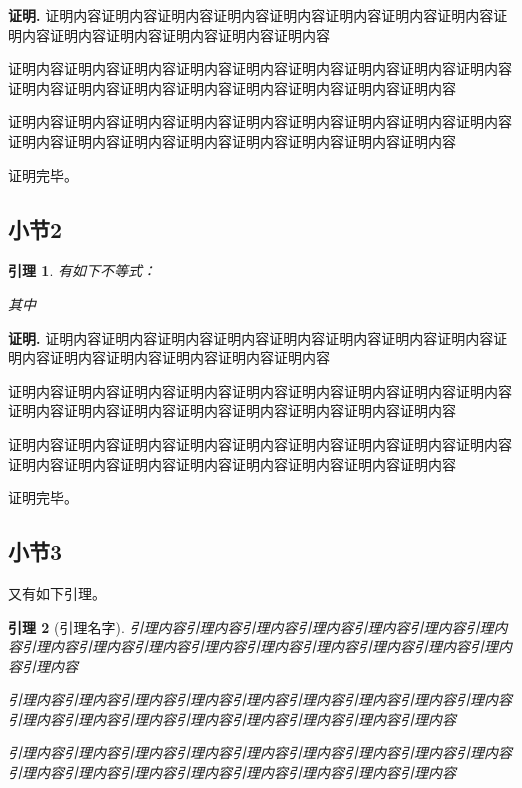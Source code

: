 \documentclass[a4paper, 12pt, oneside]{article}
\theoremstyle{cn_theorem}
\newtheorem{lemma}{引理}[section]   %
\begin{document}
\textbf{\heiti 证明.} 证明内容证明内容证明内容证明内容证明内容证明内容证明内容证明内容证明内容证明内容证明内容证明内容证明内容证明内容

证明内容证明内容证明内容证明内容证明内容证明内容证明内容证明内容证明内容证明内容证明内容证明内容证明内容证明内容证明内容证明内容证明内容

证明内容证明内容证明内容证明内容证明内容证明内容证明内容证明内容证明内容证明内容证明内容证明内容证明内容证明内容证明内容证明内容证明内容

证明完毕。

\subsection{小节2}

\begin{lemma} \label{公式交叉引用名字}
有如下不等式：

其中

\end{lemma}

\textbf{\heiti 证明.} 证明内容证明内容证明内容证明内容证明内容证明内容证明内容证明内容证明内容证明内容证明内容证明内容证明内容证明内容

证明内容证明内容证明内容证明内容证明内容证明内容证明内容证明内容证明内容证明内容证明内容证明内容证明内容证明内容证明内容证明内容证明内容

证明内容证明内容证明内容证明内容证明内容证明内容证明内容证明内容证明内容证明内容证明内容证明内容证明内容证明内容证明内容证明内容证明内容

证明完毕。

\subsection{小节3}
又有如下引理。

\begin{lemma}[引理名字] \label{交叉引用名字}
引理内容引理内容引理内容引理内容引理内容引理内容引理内容引理内容引理内容引理内容引理内容引理内容引理内容引理内容引理内容引理内容引理内容

引理内容引理内容引理内容引理内容引理内容引理内容引理内容引理内容引理内容引理内容引理内容引理内容引理内容引理内容引理内容引理内容引理内容

引理内容引理内容引理内容引理内容引理内容引理内容引理内容引理内容引理内容引理内容引理内容引理内容引理内容引理内容引理内容引理内容引理内容



\end{lemma}
\end{document}
